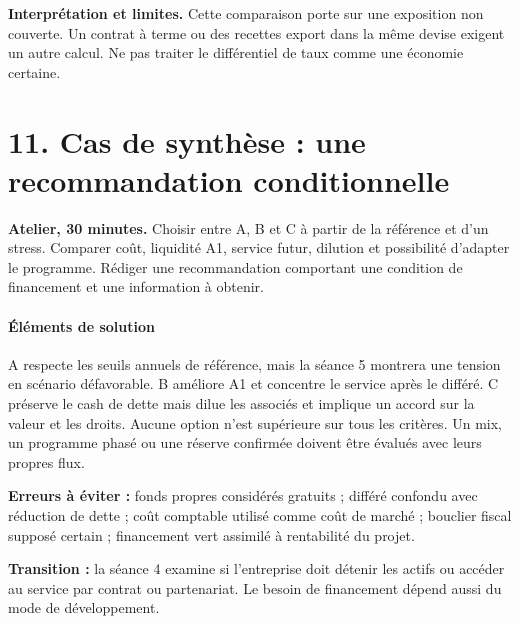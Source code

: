 \documentclass[12pt,a4paper]{article}
\begin{document}
\textbf{Interprétation et limites.} Cette comparaison porte sur une exposition non couverte. Un contrat à terme ou des recettes export dans la même devise exigent un autre calcul. Ne pas traiter le différentiel de taux comme une économie certaine.

\section*{11. Cas de synthèse : une recommandation conditionnelle}
\textbf{Atelier, 30 minutes.} Choisir entre A, B et C à partir de la référence et d’un stress. Comparer coût, liquidité A1, service futur, dilution et possibilité d’adapter le programme. Rédiger une recommandation comportant une condition de financement et une information à obtenir.



\paragraph{Éléments de solution}
A respecte les seuils annuels de référence, mais la séance 5 montrera une tension en scénario défavorable. B améliore A1 et concentre le service après le différé. C préserve le cash de dette mais dilue les associés et implique un accord sur la valeur et les droits. Aucune option n’est supérieure sur tous les critères. Un mix, un programme phasé ou une réserve confirmée doivent être évalués avec leurs propres flux.


\textbf{Erreurs à éviter :} fonds propres considérés gratuits ; différé confondu avec réduction de dette ; coût comptable utilisé comme coût de marché ; bouclier fiscal supposé certain ; financement vert assimilé à rentabilité du projet.


\textbf{Transition :} la séance 4 examine si l’entreprise doit détenir les actifs ou accéder au service par contrat ou partenariat. Le besoin de financement dépend aussi du mode de développement.
\end{document}

